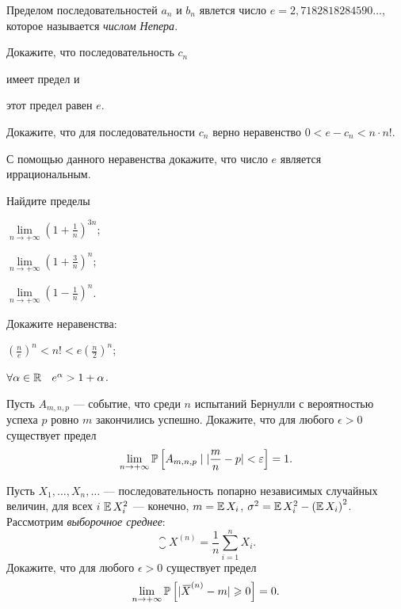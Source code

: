 \documentclass[a4paper, 12pt, num=31]{listok}
\begin{document}
\begin{definition}
    Пределом последовательностей $a_n$ и $b_n$ явлется число $e = 2{,}7182818284590\dots$, которое называется \textit{числом Непера}.
\end{definition}
\begin{problem}
    Докажите, что последовательность $c_n$
    \begin{probparts}
        \item имеет предел и 
        \item этот предел равен $e$.
    \end{probparts}
\end{problem}
\begin{problem}[\hard]
\begin{probparts}
    \item Докажите, что для последовательности $c_n$ верно неравенство $0 < e - c_n < n\cdot{n!}$.
    \item С помощью данного неравенства докажите, что число $e$ является иррациональным.
\end{probparts}
\end{problem}
\begin{problem}
    Найдите пределы
    \begin{probparts}
        \item $\lim\limits_{n \to + \infty} {\left ( 1 + \frac 1n \right )}^{3n}$;
        \item $\lim\limits_{n \to + \infty} {\left ( 1 + \frac 3n \right )}^{n}$;
        \item $\lim\limits_{n \to + \infty} {\left ( 1 - \frac 1n \right )}^{n}$.
    \end{probparts}
\end{problem}
\begin{problem}
    Докажите неравенства:
    \begin{probparts}
        \item ${\left ( \frac n e \right )}^n < n! < e {\left ( \frac n2 \right )}^n$;
        \item $\forall{\alpha \in \R} e^\alpha > 1 + \alpha$.
    \end{probparts}
\end{problem}
\begin{problem}
    Пусть $A_{m, n, p}$ --- событие, что среди $n$ испытаний Бернулли с вероятностью успеха $p$ ровно $m$ закончились успешно.
    Докажите, что для любого $\epsilon > 0$ существует предел
    \[
        \lim_{n \to + \infty} \mathbb{P}\left [ A_{m, n, p} \mid |\frac mn - p| < \varepsilon \right ] = 1.
    \]
\end{problem}
\begin{problem}
    Пусть $X_1, \dots, X_n, \dots$ --- последовательность попарно независимых случайных величин,
    для всех $i$ $\operatorname{\mathbb{E}}{X_i^2}$ --- конечно, $m = \operatorname{\mathbb{E}}{X_i}$, $\sigma^2 = \operatorname{\mathbb{E}}{X_i^2} - {(\operatorname{\mathbb{E}}{X_i})}^2$.
    Рассмотрим \textit{выборочное среднее}:
    \[
        {\closure{X}}^{(n)} = \frac 1n \sum_{i = 1}^n X_i.
    \]
    Докажите, что для любого $\epsilon > 0$ существует предел
    \[
        \lim_{n \to +\infty} \mathbb{P}\left [ |{{}\mkern3mu\overline{\mkern-3muX}}^{(n)} - m| \geqslant 0 \right ] = 0.
    \]
\end{problem}
\end{document}

